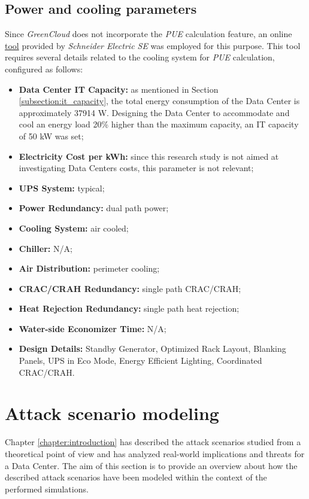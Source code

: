 \subsection{Power and cooling parameters} \label{subsection:powercooling}
Since \emph{GreenCloud} does not incorporate the \emph{PUE} calculation feature, an online \href{https://www.se.com/ww/en/work/solutions/system/s1/data-center-and-network-systems/trade-off-tools/data-center-efficiency-and-pue-calculator/}{tool} provided by \emph{Schneider Electric SE} was employed for this purpose. This tool requires several details related to the cooling system for \emph{PUE} calculation, configured as follows:
\begin{itemize}
    \item \textbf{Data Center IT Capacity:} as mentioned in Section \ref{subsection:it_capacity}, the total energy consumption of the Data Center is approximately 37914 W. Designing the Data Center to accommodate and cool an energy load 20\% higher than the maximum capacity, an IT capacity of 50 kW was set;
    \item \textbf{Electricity Cost per kWh:} since this research study is not aimed at investigating Data Centers costs, this parameter is not relevant;
    \item \textbf{UPS System:} typical;
    \item \textbf{Power Redundancy:} dual path power;
    \item \textbf{Cooling System:} air cooled;
    \item \textbf{Chiller:} N/A;
    \item \textbf{Air Distribution:} perimeter cooling;
    \item \textbf{CRAC/CRAH Redundancy:} single path CRAC/CRAH;
    \item \textbf{Heat Rejection Redundancy:} single path heat rejection;
    \item \textbf{Water-side Economizer Time:} N/A;
    \item \textbf{Design Details:} Standby Generator, Optimized Rack Layout, Blanking Panels, UPS in Eco Mode, Energy Efficient Lighting, Coordinated CRAC/CRAH.
\end{itemize}

\section{Attack scenario modeling}
Chapter \ref{chapter:introduction} has described the attack scenarios studied from a theoretical point of view and has analyzed real-world implications and threats for a Data Center. The aim of this section is to provide an overview about how the described attack scenarios have been modeled within the context of the performed simulations.

